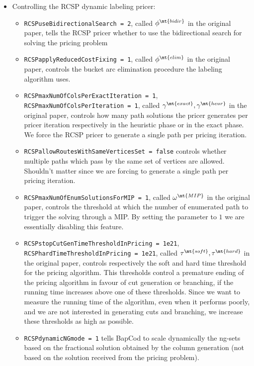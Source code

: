 \begin{itemize}
	\item Controlling the RCSP dynamic labeling pricer:
	      \begin{itemize}
		      \item \texttt{RCSPuseBidirectionalSearch = 2}, called $\phi^\mt{bidir}$ in the original paper, tells the RCSP pricer whether to use the bidirectional search for solving the pricing problem
		      \item \texttt{RCSPapplyReducedCostFixing = 1}, called $\phi^\mt{elim}$ in the original paper, controls the bucket arc elimination procedure the labeling algorithm uses.
		      \item \texttt{RCSPmaxNumOfColsPerExactIteration = 1}, \texttt{RCSPmaxNumOfColsPerIteration = 1}, called $\gamma^\mt{exact}, \gamma^\mt{heur}$ in the original paper, controls how many path solutions the pricer generates per pricer iteration respectively in the heuristic phase or in the exact phase.
		            We force the RCSP pricer to generate a single path per pricing iteration.
		      \item \texttt{RCSPallowRoutesWithSameVerticesSet = false} controls whether multiple paths which pass by the same set of vertices are allowed.
		            Shouldn't matter since we are forcing to generate a single path per pricing iteration.
		      \item \texttt{RCSPmaxNumOfEnumSolutionsForMIP = 1}, called $\omega^\mt{MIP}$ in the original paper, controls the threshold at which the number of enumerated path to trigger the solving through a MIP.
		            By setting the parameter to $1$ we are essentially disabling this feature.
		      \item \texttt{RCSPstopCutGenTimeThresholdInPricing = 1e21}, \texttt{RCSPhardTimeThresholdInPricing = 1e21}, called $\tau^\mt{soft}, \tau^\mt{hard}$ in the original paper, controls respectively the soft and hard time threshold for the pricing algorithm.
		            This thresholds control a premature ending of the pricing algorithm in favour of cut generation or branching, if the running time increases above one of these thresholds.
		            Since we want to measure the running time of the algorithm, even when it performs poorly, and we are not interested in generating cuts and branching, we increase these thresholds as high as possible.
		      \item \texttt{RCSPdynamicNGmode = 1} tells BapCod to scale dynamically the ng-sets based on the fractional solution obtained by the column generation (not based on the solution received from the pricing problem).

\end{itemize}
\end{itemize}
